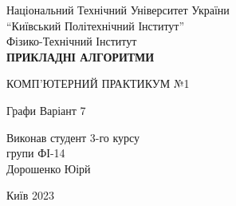 \begin{titlepage}
    \begin{center}
        \vspace*{1cm}
\Large
            Національний Технічний Університет України\\
“Київський Політехнічний Інститут”\\
Фізико-Технічний Інститут\\
  \vspace{1.5cm}
        \huge
        \textbf{ПРИКЛАДНІ АЛГОРИТМИ}
            
        \vspace{0.5cm}
        \LARGE
        КОМП’ЮТЕРНИЙ ПРАКТИКУМ №1

        Графи Варіант 7
            
        \vspace{1.5cm}
            

        \vfill
            
	\end{center}
            	
	\begin{flushright}
        \Large
        	Виконав студент 3-го курсу\\
	групи ФІ-14\\
	Дорошенко Юірй\\
    	\end{flushright} 
 \vspace{2.5cm}
\centering \Large Київ 2023
\end{titlepage}
